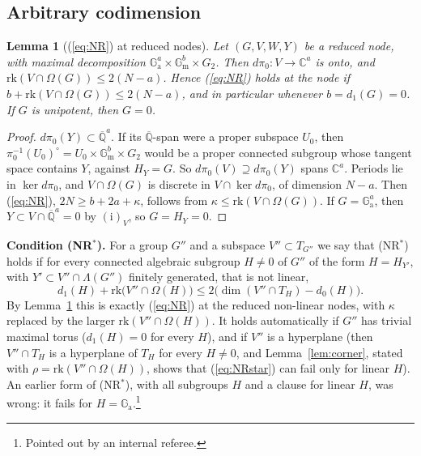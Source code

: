 \documentclass[11pt]{amsart}
\newtheorem{lemma}[theorem]{Lemma}
\theoremstyle{definition}
\newcommand{\Qb}{\overline{\mathbb{Q}}}
\newcommand{\C}{\mathbb{C}}
\newcommand{\Ga}{\mathbb{G}_{\mathrm a}}
\newcommand{\Gm}{\mathbb{G}_{\mathrm m}}
\begin{document}
\subsection{Arbitrary codimension}\label{sec:codim}

\begin{lemma}[(\ref{eq:NR}) at reduced nodes]\label{lem:reducedNR}
Let $(G,V,W,Y)$ be a reduced node, with maximal decomposition $\Ga^a\times\Gm^b\times G_2$. Then $d\pi_0\colon V\to\C^a$ is
onto, and $\mathrm{rk}(V\cap\Omega(G))\le2(N-a)$. Hence (\ref{eq:NR}) holds at the node if
$b+\mathrm{rk}(V\cap\Omega(G))\le2(N-a)$, and in particular whenever $b=d_1(G)=0$. If $G$ is unipotent, then $G=0$.
\end{lemma}

\begin{proof}
$d\pi_0(Y)\subset\Qb^a$. If its $\Qb$-span were a proper subspace $U_0$, then $\pi_0^{-1}(U_0)^\circ=U_0\times\Gm^b\times G_2$
would be a proper connected subgroup whose tangent space contains $Y$, against $H_Y=G$. So $d\pi_0(V)\supseteq d\pi_0(Y)$
spans $\C^a$. Periods lie in $\ker d\pi_0$, and $V\cap\Omega(G)$ is discrete in $V\cap\ker d\pi_0$, of dimension $N-a$. Then
(\ref{eq:NR}), $2N\ge b+2a+\kappa$, follows from $\kappa\le\mathrm{rk}(V\cap\Omega(G))$. If $G=\Ga^a$, then $Y\subset
V\cap\Qb^a=0$ by $(\mathrm i)_V$, so $G=H_Y=0$.
\end{proof}

\noindent\textbf{Condition (NR$^*$).} For a group $G''$ and a subspace $V''\subset T_{G''}$ we say that (NR$^*$) holds if
for every connected algebraic subgroup $H\ne0$ of $G''$ of the form $H=H_{Y'}$, with $Y'\subset V''\cap\Lambda(G'')$
finitely generated, that is not linear,
\begin{equation}\label{eq:NRstar}
d_1(H)+\mathrm{rk}\bigl(V''\cap\Omega(H)\bigr)\le2\bigl(\dim(V''\cap T_H)-d_0(H)\bigr).
\end{equation}
By Lemma~\ref{lem:reducedNR} this is exactly (\ref{eq:NR}) at the reduced non-linear nodes, with $\kappa$ replaced by the
larger $\mathrm{rk}(V''\cap\Omega(H))$. It holds automatically if $G''$ has trivial maximal torus ($d_1(H)=0$ for every $H$),
and if $V''$ is a hyperplane (then $V''\cap T_H$ is a hyperplane of $T_H$ for every $H\ne0$, and Lemma~\ref{lem:corner},
stated with $\rho=\mathrm{rk}(V''\cap\Omega(H))$, shows that (\ref{eq:NRstar}) can fail only for linear $H$). An earlier form
of (NR$^*$), with all subgroups $H$ and a clause for linear $H$, was wrong: it fails for $H=\Ga$.\footnote{Pointed out by
an internal referee.}
\end{document}
